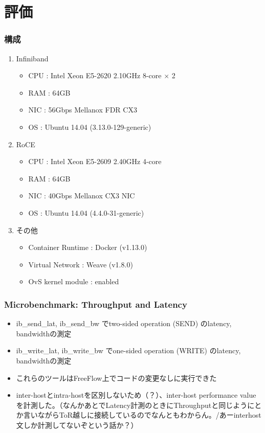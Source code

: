 \documentclass[dvipdfmx,9pt,notheorems]{beamer}
\theoremstyle{definition}
\begin{document}
\section{評価}
\begin{frame}\frametitle{構成}
	\begin{enumerate}
		\item Infiniband
		\begin{itemize}
			\item CPU : Intel Xeon E5-2620 2.10GHz 8-core $\times$ 2
			\item RAM : 64GB
			\item NIC : 56Gbps Mellanox FDR CX3
			\item OS  : Ubuntu 14.04 (3.13.0-129-generic)
		\end{itemize}
		\item RoCE
		\begin{itemize}
			\item CPU : Intel Xeon E5-2609 2.40GHz 4-core
			\item RAM : 64GB
			\item NIC : 40Gbps Mellanox CX3 NIC
			\item OS  : Ubuntu 14.04 (4.4.0-31-generic)
		\end{itemize}
		\item その他
		\begin{itemize}
			\item Container Runtime : Docker (v1.13.0)
			\item Virtual Network   : Weave (v1.8.0)
			\item OvS kernel module : enabled
		\end{itemize}
	\end{enumerate}
\end{frame}

\begin{frame}\frametitle{Microbenchmark: Throughput and Latency}
	\begin{itemize}
		\item ib\_send\_lat, ib\_send\_bw でtwo-sided operation (SEND) のlatency, bandwidthの測定
		\item ib\_write\_lat, ib\_write\_bw でone-sided operation (WRITE) のlatency, bandwidthの測定
		\item これらのツールはFreeFlow上で{\color{orange}コードの変更なしに実行できた}
		\item inter-hostとintra-hostを区別しないため（？）、inter-host performance valueを計測した。（なんかあとでLatency計測のときにThroughputと同じようにとか言いながらToR越しに接続しているのでなんともわからん。/あーinterhost文しか計測してないぞという話か？）
	\end{itemize}
\end{frame}
\end{document}
